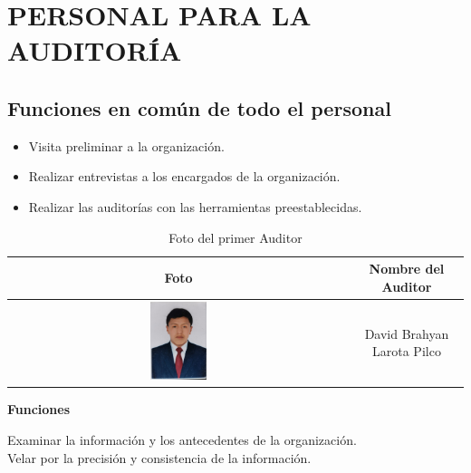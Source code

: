 \documentclass[12pt,a4paper]{article}
\begin{document}
\section*{PERSONAL PARA LA AUDITORÍA}
\subsection*{Funciones en común de todo el personal}
\begin{itemize}
    \item Visita preliminar a la organización.
    \item Realizar entrevistas a los encargados de la organización.
    \item Realizar las auditorías con las herramientas preestablecidas.
    
\end{itemize}

\begin{table}[ht]
    \centering
    \begin{tabular}{cc}
        \toprule
        \textbf{Foto} & \textbf{Nombre del Auditor} \\
        \midrule
        
        \includegraphics[width=0.17\textwidth]{images/fotodavid.jpeg} & David Brahyan Larota Pilco \\
        
        \bottomrule
    \end{tabular}
    \caption{Foto del primer Auditor}
    \par \textbf{Funciones} \par Examinar la información y los antecedentes de la organización. \\
    Velar por la precisión y consistencia de la información.
    
\end{table}

\newpage
\end{document}
